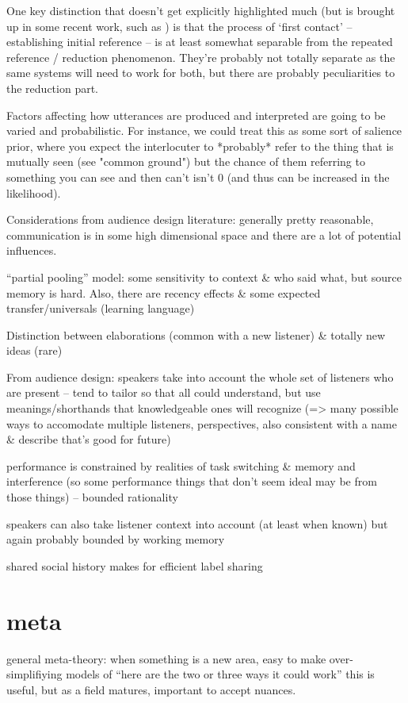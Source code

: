 \documentclass[]{article}
\begin{document}
One key distinction that doesn't get explicitly highlighted much (but is brought up in some recent work, such as \cite{leung2023}) is that the process of `first contact' -- establishing initial reference -- is at least somewhat separable from the repeated reference / reduction phenomenon. They're probably not totally separate as the same systems will need to work for both, but there are probably peculiarities to the reduction part. 

Factors affecting how utterances are produced and interpreted are going to be varied and probabilistic. For instance, we could treat this as some sort of salience prior, where you expect the interlocuter to *probably* refer to the thing that is mutually seen (see "common ground") but the chance of them referring to something you can see and then can't isn't 0 (and thus can be increased in the likelihood). 

Considerations from audience design literature: generally pretty reasonable, communication is in some high dimensional space and there are a lot of potential influences. 

``partial pooling'' model: some sensitivity to context \& who said what, but source memory is hard. Also, there are recency effects \& some expected transfer/universals (learning language) 

Distinction between elaborations (common with a new listener) \& totally new ideas (rare)

From audience design: speakers take into account the whole set of listeners who are present -- tend to tailor so that all could understand, but use meanings/shorthands that knowledgeable ones will recognize (=> many possible ways to accomodate multiple listeners, perspectives, also consistent with a name \& describe that's good for future) 

performance is constrained by realities of task switching \& memory and interference (so some performance things that don't seem ideal may be from those things) -- bounded rationality 

speakers can also take listener context into account (at least when known) but again probably bounded by working memory

shared social history makes for efficient label sharing 


\section{meta}
general meta-theory: when something is a new area, easy to make over-simplifiying models of “here are the two or three ways it could work” this is useful, but as a field matures, important to accept nuances.
\end{document}
